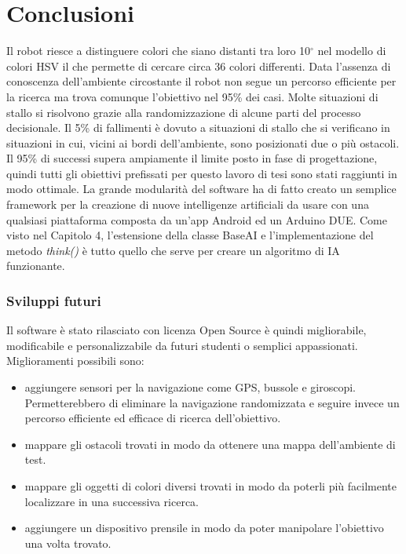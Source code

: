 \chapter*{Conclusioni}
\fancyfoot[C]{\thepage}
Il robot riesce 
a distinguere colori che siano distanti tra loro 10$^\circ$ nel modello di colori HSV
il che permette di cercare circa 36 colori differenti. Data l'assenza di conoscenza 
dell'ambiente circostante il robot non segue un percorso efficiente per la ricerca ma trova comunque l'obiettivo
nel 95\% dei casi. Molte situazioni di stallo si risolvono grazie alla randomizzazione 
di alcune parti del processo decisionale. Il 5\% di fallimenti è dovuto a situazioni di stallo 
che si verificano in situazioni in cui, vicini ai bordi dell'ambiente, sono posizionati 
due o più ostacoli. Il 95\% di successi supera ampiamente il limite posto in fase di progettazione, 
quindi tutti gli obiettivi prefissati per questo lavoro di tesi sono stati raggiunti in modo
ottimale.
La grande modularità del software ha di fatto creato un semplice framework per 
la creazione di nuove intelligenze artificiali da usare con una qualsiasi piattaforma
composta da un'app Android ed un Arduino DUE. Come visto nel Capitolo 4, l'estensione della
classe BaseAI e l'implementazione del metodo \emph{think()} è tutto quello che serve per
creare un algoritmo di IA funzionante.
\subsection* {Sviluppi futuri}
Il software è stato rilasciato con licenza Open Source è quindi migliorabile, 
modificabile e personalizzabile da futuri studenti o semplici appassionati.
Miglioramenti possibili sono:
\begin{itemize}
\item aggiungere sensori per la navigazione come GPS, 
bussole e giroscopi. Permetterebbero di eliminare la navigazione randomizzata e seguire invece un percorso efficiente ed efficace
di ricerca dell'obiettivo.
\item mappare gli ostacoli trovati in modo da ottenere una mappa dell'ambiente di test.
\item mappare gli oggetti di colori diversi trovati in modo da poterli più facilmente localizzare 
in una successiva ricerca.
\item aggiungere un dispositivo prensile in modo da poter manipolare l'obiettivo una volta trovato.
\end{itemize}

